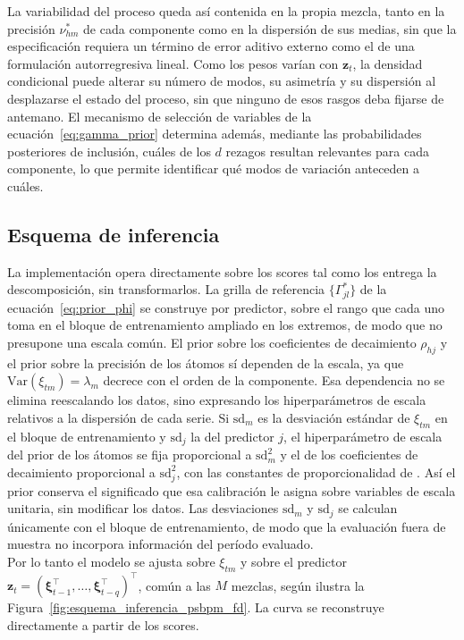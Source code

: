 La variabilidad del proceso queda así contenida en la propia mezcla, tanto en la precisión $\nu_{hm}^*$ de cada componente como en la dispersión de sus medias, sin que la especificación requiera un término de error aditivo externo como el de una formulación autorregresiva lineal. Como los pesos varían con $\mathbf{z}_t$, la densidad condicional puede alterar su número de modos, su asimetría y su dispersión al desplazarse el estado del proceso, sin que ninguno de esos rasgos deba fijarse de antemano. El mecanismo de selección de variables de la ecuación~\eqref{eq:gamma_prior} determina además, mediante las probabilidades posteriores de inclusión, cuáles de los $d$ rezagos resultan relevantes para cada componente, lo que permite identificar qué modos de variación anteceden a cuáles.

\subsection{Esquema de inferencia}
\label{03_04_01_esquema_inferencia}

La implementación opera directamente sobre los scores tal como los entrega la descomposición, sin transformarlos. La grilla de referencia $\{\Gamma_{jl}^*\}$ de la ecuación~\eqref{eq:prior_phi} se construye por predictor, sobre el rango que cada uno toma en el bloque de entrenamiento ampliado en los extremos, de modo que no presupone una escala común. El prior sobre los coeficientes de decaimiento $\rho_{hj}$ y el prior sobre la precisión de los átomos sí dependen de la escala, ya que $\mathrm{Var}(\xi_{tm}) = \lambda_m$ decrece con el orden de la componente. Esa dependencia no se elimina reescalando los datos, sino expresando los hiperparámetros de escala relativos a la dispersión de cada serie. Si $\mathrm{sd}_m$ es la desviación estándar de $\xi_{tm}$ en el bloque de entrenamiento y $\mathrm{sd}_j$ la del predictor $j$, el hiperparámetro de escala del prior de los átomos se fija proporcional a $\mathrm{sd}_m^{2}$ y el de los coeficientes de decaimiento proporcional a $\mathrm{sd}_j^{2}$, con las constantes de proporcionalidad de \citet{03_02_chung2009nonparametric}. Así el prior conserva el significado que esa calibración le asigna sobre variables de escala unitaria, sin modificar los datos. Las desviaciones $\mathrm{sd}_m$ y $\mathrm{sd}_j$ se calculan únicamente con el bloque de entrenamiento, de modo que la evaluación fuera de muestra no incorpora información del período evaluado.\\

Por lo tanto el modelo se ajusta sobre $\xi_{tm}$ y sobre el predictor $\mathbf{z}_t = (\boldsymbol{\xi}_{t-1}^\top, \dots, \boldsymbol{\xi}_{t-q}^\top)^\top$, común a las $M$ mezclas, según ilustra la Figura~\ref{fig:esquema_inferencia_psbpm_fd}. La curva se reconstruye directamente a partir de los scores.\\

